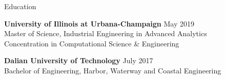 \documentclass{resume} %
\begin{document}





\begin{rSection}{Education}



{\bf University of Illinois at Urbana-Champaign} \hfill {May 2019}
\\ 
Master of Science, Industrial Engineering in Advanced Analytics %
\\
Concentration in Computational Science \& Engineering

{\bf Dalian University of Technology} \hfill {July 2017}
\\ 
Bachelor of Engineering, Harbor, Waterway and Coastal Engineering %

\end{rSection}
\end{document}
